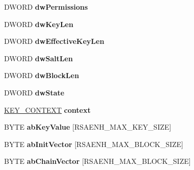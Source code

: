 \begin{DoxyCompactItemize}
\mbox{\label{structtag_c_r_y_p_t_k_e_y_a69f8cdc057de09acc6d3b6a0f5df8e30}} 
D\+W\+O\+RD {\bfseries dw\+Permissions}
\item 
\mbox{\label{structtag_c_r_y_p_t_k_e_y_adc94856d47d0347a80be9100bdbdfd0d}} 
D\+W\+O\+RD {\bfseries dw\+Key\+Len}
\item 
\mbox{\label{structtag_c_r_y_p_t_k_e_y_a2b9b11e24d05a24a8817998475ad5095}} 
D\+W\+O\+RD {\bfseries dw\+Effective\+Key\+Len}
\item 
\mbox{\label{structtag_c_r_y_p_t_k_e_y_ac6aaf8500b1e98dffd4c8aba6603d6df}} 
D\+W\+O\+RD {\bfseries dw\+Salt\+Len}
\item 
\mbox{\label{structtag_c_r_y_p_t_k_e_y_af5f68b8db4468ccfda4ae0ed6adda6fa}} 
D\+W\+O\+RD {\bfseries dw\+Block\+Len}
\item 
\mbox{\label{structtag_c_r_y_p_t_k_e_y_aa5d3b879f47f62a34894f60cb6ac2b8e}} 
D\+W\+O\+RD {\bfseries dw\+State}
\item 
\mbox{\label{structtag_c_r_y_p_t_k_e_y_a91e9dc8ee18ff12111578c9a2f2414a3}} 
\hyperlink{uniontag_k_e_y___c_o_n_t_e_x_t}{K\+E\+Y\+\_\+\+C\+O\+N\+T\+E\+XT} {\bfseries context}
\item 
\mbox{\label{structtag_c_r_y_p_t_k_e_y_aaa4f234e1dc19aa481e42ff74c5012c9}} 
B\+Y\+TE {\bfseries ab\+Key\+Value} \mbox{[}R\+S\+A\+E\+N\+H\+\_\+\+M\+A\+X\+\_\+\+K\+E\+Y\+\_\+\+S\+I\+ZE\mbox{]}
\item 
\mbox{\label{structtag_c_r_y_p_t_k_e_y_a3e3eaea0a4412bab185dd213bdda34c3}} 
B\+Y\+TE {\bfseries ab\+Init\+Vector} \mbox{[}R\+S\+A\+E\+N\+H\+\_\+\+M\+A\+X\+\_\+\+B\+L\+O\+C\+K\+\_\+\+S\+I\+ZE\mbox{]}
\item 
\mbox{\label{structtag_c_r_y_p_t_k_e_y_af9dcadcce057f565add5fa1a363e8169}} 
B\+Y\+TE {\bfseries ab\+Chain\+Vector} \mbox{[}R\+S\+A\+E\+N\+H\+\_\+\+M\+A\+X\+\_\+\+B\+L\+O\+C\+K\+\_\+\+S\+I\+ZE\mbox{]}

\end{DoxyCompactItemize}
